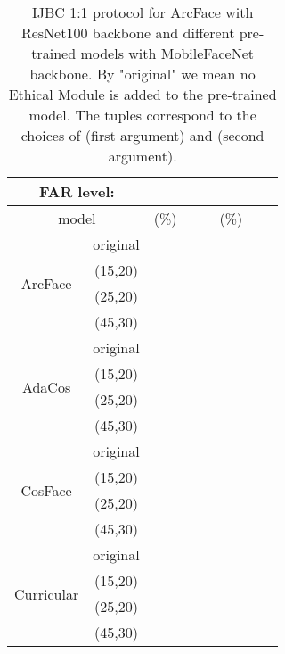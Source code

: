 \documentclass[nohyperref]{article}
\theoremstyle{plain}
\theoremstyle{definition}
\theoremstyle{remark}
\begin{document}
\begin{table*}
\center
\caption{IJBC 1:1 protocol for ArcFace with ResNet100 backbone and different pre-trained models with MobileFaceNet backbone. By "original" we mean no Ethical Module is added to the pre-trained model. The tuples correspond to the choices of  (first argument) and  (second argument).}
\begin{tabular}{ c | c | ccc | ccc}
 \multicolumn{2}{c}{ FAR level: }         & \multicolumn{3}{c}{ } & \multicolumn{3}{c}{ } \\ 
 \hline \hline
  \multicolumn{2}{c}{ model }    &  (\%)  &   &   &  (\%)  &         &         \\ \hline
                              & original  &   &  &   &   &   &   \\
  \multirow{2}{*}{ArcFace}    & (15,20) &   &  &   &   &   &   \\
                              & (25,20) &   &  &  &   &   &   \\
                              & (45,30) &   &  &   &   &   &   \\ \hline   \hline   
                              & original  &  &  &   &   &   &   \\
  \multirow{2}{*}{AdaCos}     & (15,20) &  &  &   &  &   &   \\
                              & (25,20) &  &  &  &  &   &   \\
                              & (45,30) &  &  &   &   &   &   \\ \hline 
                              & original  &  &  &   &   &   &   \\
\multirow{2}{*}{CosFace}  & (15,20) &  &  &   &  &   &   \\
                              & (25,20) &  &  &  &  &   &  \\
                              & (45,30) &  &  &   &   &   &   \\ \hline 
                              & original  &  &  &   &   &   &   \\
  \multirow{2}{*}{Curricular} & (15,20) &  &  &   &  &   &   \\
                              & (25,20) &  &  &  &  &   &   \\
                              & (45,30) &  &  &   &   &   &   \\ \hline 
\end{tabular}
\label{tab:table5}
\end{table*}
\end{document}
